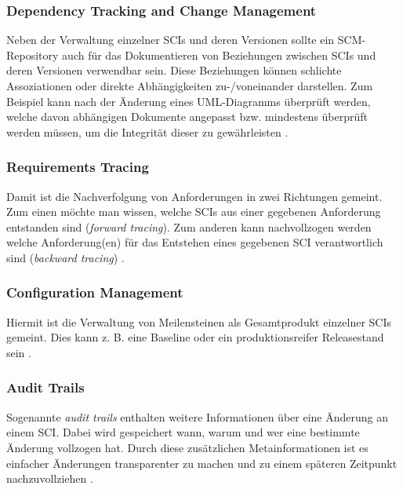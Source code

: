 \documentclass[runningheads,a4paper]{uwsese}
\begin{document}
\subsubsection{Dependency Tracking and Change Management}
Neben der Verwaltung einzelner SCIs und deren Versionen sollte ein SCM-Repository
auch für das Dokumentieren von Beziehungen zwischen SCIs und deren Versionen
verwendbar sein. Diese Beziehungen können schlichte Assoziationen oder direkte
Abhängigkeiten zu-/voneinander darstellen. Zum Beispiel kann nach der Änderung
eines UML-Diagramms überprüft werden, welche davon abhängigen Dokumente
angepasst bzw. mindestens überprüft werden müssen, um die Integrität dieser
zu gewährleisten
\cite[p. 592]{Pressman:2009:SEP:1593949}.

\subsubsection{Requirements Tracing}
Damit ist die Nachverfolgung von Anforderungen in zwei Richtungen gemeint.
Zum einen möchte man wissen, welche SCIs aus einer gegebenen Anforderung
entstanden sind ({\em forward tracing}). Zum anderen kann nachvollzogen werden
welche Anforderung(en) für das Entstehen eines gegebenen SCI verantwortlich sind
({\em backward tracing})
\cite[p. 592]{Pressman:2009:SEP:1593949}.

\subsubsection{Configuration Management}
Hiermit ist die Verwaltung von Meilensteinen als Gesamtprodukt einzelner SCIs
gemeint. Dies kann z. B. eine Baseline oder ein produktionsreifer Releasestand sein
\cite[p. 592]{Pressman:2009:SEP:1593949}.

\subsubsection{Audit Trails}
Sogenannte {\em audit trails} enthalten weitere Informationen über eine Änderung
an einem SCI. Dabei wird gespeichert wann, warum und wer eine bestimmte Änderung
vollzogen hat. Durch diese zusätzlichen Metainformationen ist es einfacher
Änderungen transparenter zu machen und zu einem späteren Zeitpunkt nachzuvollziehen
\cite[p. 592]{Pressman:2009:SEP:1593949}.

\end{document}
